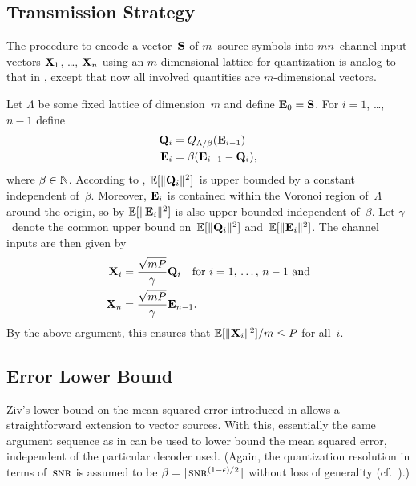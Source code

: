 \subsection{Transmission Strategy}

The procedure to encode a vector~$\S$ of $m$~source symbols into $mn$~channel
input vectors $\X_1$, \ldots, $\X_n$ using an $m$-dimensional lattice for
quantization is analog to that in , except that now all
involved quantities are $m$-dimensional vectors.

Let $\Lambda$ be some fixed lattice of dimension~$m$ and define $\Evc_0 = \S$.
For $i = 1$, \ldots, $n-1$ define
\begin{align}
  \Q_i &= \QLb(\Evc_{i-1})  \nonumber \\
  \Evc_i &= \beta ( \Evc_{i-1} - \Q_i), \label{eq:latticeQE}
\end{align}
where $\beta \in \NN$. According to , $\E[\|\Q_i\|^2]$~is
upper bounded by a constant independent of~$\beta$. Moreover, $\Evc_i$
is contained within the Voronoi region of~$\Lambda$ around the origin, so by
 $\E[\|\Evc_i\|^2]$ is also upper bounded independent
of~$\beta$. Let $\gamma$~denote the common upper bound on~$\E[\|\Q_i\|^2]$
and~$\E[\|\Evc_i\|^2]$.  The channel inputs are then given by
\begin{align*}
  \X_i &= \frac{\sqrt{mP}}{\gamma} \Q_i \quad \text{for $i = 1$, \dots, $n-1$
  and} \\
  \X_n &= \frac{\sqrt{mP}}{\gamma} \Evc_{n-1}.
\end{align*}
By the above argument, this ensures that $\E[\|\X_i\|^2]/m \le P$ for all~$i$.



\subsection{Error Lower Bound}

Ziv's lower bound on the mean squared error introduced in 
allows a straightforward extension to vector sources. With this, essentially the
same argument sequence as in  can be used to lower bound the
mean squared error, independent of the particular decoder used.  (Again,
the quantization resolution in terms of~$\snr$ is assumed to be $\beta = \lceil
\snr^{(1-\e)/2} \rceil$ without loss of generality (cf.~).)

